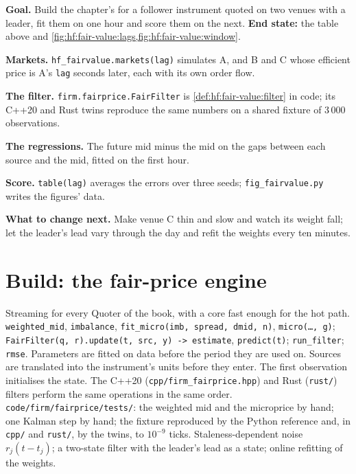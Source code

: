 \begin{tutorial}
\textbf{Goal.} Build the chapter's  for a follower instrument quoted on two venues with a leader, fit them on one hour and score them
on the next. \textbf{End state:} the table above and \cref{fig:hf:fair-value:lags,fig:hf:fair-value:window}.
\begin{tutsteps}
\item \textbf{Markets.} \texttt{hf\_fairvalue.markets(lag)} simulates A, and B and C whose efficient price is A's \texttt{lag} seconds later,
each with its own order flow.
\item \textbf{The filter.} \texttt{firm.fairprice.FairFilter} is \cref{def:hf:fair-value:filter} in code; its C++20 and Rust twins reproduce the
same numbers on a shared fixture of 3\,000 observations.
\label{lst:hf:fair-value:filter}
\item \textbf{The regressions.} The future mid minus the mid on the gaps between each source and the mid, fitted on the first hour.
\label{lst:hf:fair-value:weights}
\item \textbf{Score.} \texttt{table(lag)} averages the errors over three seeds; \texttt{fig\_fairvalue.py} writes the figures' data.
\end{tutsteps}
\textbf{What to change next.} Make venue C thin and slow and watch its weight fall; let the leader's lead vary through the day and refit the weights
every ten minutes.
\end{tutorial}

\section{Build: the fair-price engine}\label{bld:hf:fair-value:fairprice}

\begin{build}
 Streaming  for every Quoter of the book, with a core fast enough for the hot path.
 \texttt{weighted\_mid}, \texttt{imbalance}, \texttt{fit\_micro(imb, spread, dmid, n)}, \texttt{micro(\dots, g)};
\texttt{FairFilter(q, r).update(t, src, y) -> estimate}, \texttt{predict(t)}; \texttt{run\_filter}; \texttt{rmse}.
 Parameters are fitted on data before the period they are used on. Sources are translated into the instrument's units before they
enter. The first observation initialises the state. The C++20 (\texttt{cpp/firm\_fairprice.hpp}) and Rust (\texttt{rust/}) filters perform the
same operations in the same order.
 \texttt{code/firm/fairprice/tests/}: the weighted mid and the microprice by hand; one Kalman step by hand; the fixture
reproduced by the Python reference and, in \texttt{cpp/} and \texttt{rust/}, by the twins, to $10^{-9}$ ticks.
 Staleness-dependent noise $r_j(t-t_j)$; a two-state filter with the leader's lead as a state; online refitting of the weights.
\end{build}

